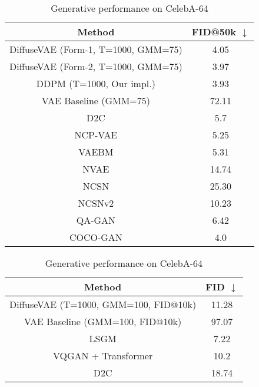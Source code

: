 \documentclass[10pt]{article} \usepackage[accepted]{tmlr}
\begin{document}
\begin{table}[]
\scriptsize
\centering
\begin{minipage}{0.49\linewidth}
\centering
\begin{tabular}{@{}cc@{}}
\toprule
\textbf{Method}                      & \textbf{FID@50k} $\downarrow$          \\ \midrule
DiffuseVAE (Form-1, T=1000, GMM=75) & 4.05 \\
DiffuseVAE (Form-2, T=1000, GMM=75) & 3.97 \\
DDPM (T=1000, Our impl.)    & 3.93          \\
VAE Baseline (GMM=75)                & 72.11         \\ \midrule
D2C \citep{sinha2021d2c}                         & 5.7           \\
NCP-VAE \citep{Aneja2020NCPVAEVA}                     & 5.25          \\
VAEBM \citep{xiao2021vaebm}                       & 5.31          \\
NVAE \citep{vahdat2021nvae}                        & 14.74         \\
NCSN \citep{song2020generative}                    & 25.30         \\
NCSNv2 \citep{song2020improved}                     & 10.23         \\
QA-GAN  \citep{NEURIPS2019_b59a51a3}                    & 6.42          \\
COCO-GAN  \citep{lin2020cocogan}                  & 4.0           \\ \bottomrule
\end{tabular}
\caption{Generative performance on CelebA-64}
\label{table:celeba64_sota}
\end{minipage}
\hfill
\begin{minipage}{0.49\linewidth}
\centering
\begin{tabular}{@{}cc@{}}
\toprule
\textbf{Method}              & \textbf{FID} $\downarrow$ \\ \midrule
DiffuseVAE (T=1000, GMM=100, FID@10k) &  11.28              \\
VAE Baseline (GMM=100, FID@10k)       &     97.07             \\ \midrule
LSGM \citep{vahdat2021scorebased}                        & 7.22             \\
VQGAN + Transformer \citep{https://doi.org/10.48550/arxiv.2012.09841}          & 10.2             \\
D2C \citep{sinha2021d2c}                          & 18.74            \\

\end{tabular}
\end{minipage}
\end{table}
\end{document}
